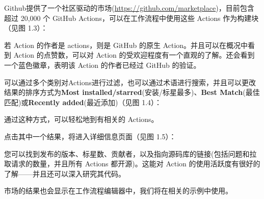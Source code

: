 Github提供了一个社区驱动的市场(\url{https://github.com/marketplace})，目前包含超过 20,000 个 GitHub Actions，可以在工作流程中使用这些 Actions 作为构建块（见图 1.3）：


若 Action 的作者是 actions，则是 GitHub 的原生 Action。并且可以在概况中看到 Action 的点赞数，可以对 Action 的受欢迎程度有一个直观的了解。还会看到一个蓝色徽章，表明该 Action 的作者已经过 GitHub 的验证。

可以通过多个类别对Actions进行过滤，也可以通过术语进行搜索，并且可以更改结果的排序方式为\textbf{Most installed/starred}(安装/标星最多)、\textbf{Best Match}(最佳匹配)或\textbf{Recently added}(最近添加)（见图 1.4）：


通过这种方式，可以轻松地到有相关的 Actions。

点击其中一个结果，将进入详细信息页面（见图 1.5）：


您可以找到发布的版本、标星数、贡献者，以及指向源码库的链接(包括问题和拉取请求的数量，并且所有 Actions 都开源)。这能对 Action 的使用活跃度有很好的了解——并且还可以深入研究其代码。

市场的结果也会显示在工作流程编辑器中，我们将在相关的示例中使用。














